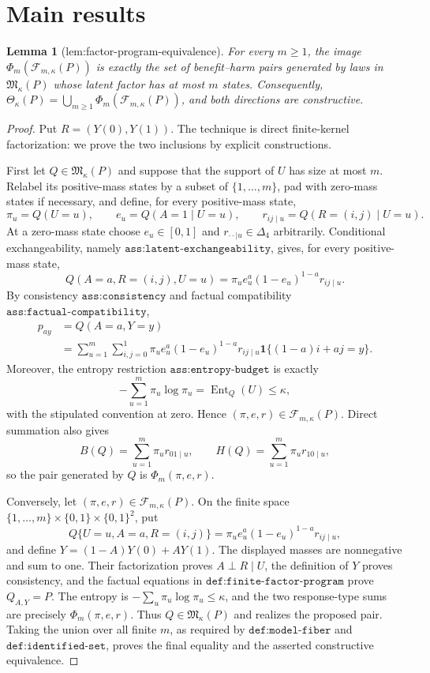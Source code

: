 \documentclass{article}
\newtheorem{lemma}{Lemma}
\begin{document}
\section{Main results}

\begin{lemma}[lem:factor-program-equivalence]\label{lem:factor-program-equivalence}
For every \(m\geq1\), the image \(\Phi_m(\mathcal F_{m,\kappa}(P))\) is exactly the set of benefit--harm pairs generated by laws in \(\mathfrak M_\kappa(P)\) whose latent factor has at most \(m\) states. Consequently, \(\Theta_\kappa(P)=\bigcup_{m\geq1}\Phi_m(\mathcal F_{m,\kappa}(P))\), and both directions are constructive.
\end{lemma}
\begin{proof}
Put \(R=(Y(0),Y(1))\).  The technique is direct finite-kernel factorization: we prove the two inclusions by explicit constructions.

First let \(Q\in\mathfrak M_\kappa(P)\) and suppose that the support of \(U\) has size at most \(m\).  Relabel its positive-mass states by a subset of \(\{1,\ldots,m\}\), pad with zero-mass states if necessary, and define, for every positive-mass state,
\[
 \pi_u=Q(U=u),\qquad e_u=Q(A=1\mid U=u),\qquad
 r_{ij\mid u}=Q(R=(i,j)\mid U=u).
\]
At a zero-mass state choose \(e_u\in[0,1]\) and \(r_{\cdot\cdot\mid u}\in\Delta_4\) arbitrarily.  Conditional exchangeability, namely \(\texttt{ass:latent-exchangeability}\), gives, for every positive-mass state,
\[
 Q(A=a,R=(i,j),U=u)
 =\pi_u e_u^a(1-e_u)^{1-a}r_{ij\mid u}.
\]
By consistency \(\texttt{ass:consistency}\) and factual compatibility \(\texttt{ass:factual-compatibility}\),
\[
 \begin{aligned}
 p_{ay}
 &=Q(A=a,Y=y)\\
 &=\sum_{u=1}^m\sum_{i,j=0}^1
 \pi_u e_u^a(1-e_u)^{1-a}r_{ij\mid u}
 \mathbf 1\{(1-a)i+aj=y\}.
 \end{aligned}
\]
Moreover, the entropy restriction \(\texttt{ass:entropy-budget}\) is exactly
\[
 -\sum_{u=1}^m\pi_u\log\pi_u=\operatorname{Ent}_Q(U)\leq\kappa,
\]
with the stipulated convention at zero.  Hence \((\pi,e,r)\in\mathcal F_{m,\kappa}(P)\).  Direct summation also gives
\[
 B(Q)=\sum_{u=1}^m\pi_u r_{01\mid u},\qquad
 H(Q)=\sum_{u=1}^m\pi_u r_{10\mid u},
\]
so the pair generated by \(Q\) is \(\Phi_m(\pi,e,r)\).

Conversely, let \((\pi,e,r)\in\mathcal F_{m,\kappa}(P)\).  On the finite space \(\{1,\ldots,m\}\times\{0,1\}\times\{0,1\}^2\), put
\[
 Q\{U=u,A=a,R=(i,j)\}
 =\pi_u e_u^a(1-e_u)^{1-a}r_{ij\mid u},
\]
and define \(Y=(1-A)Y(0)+AY(1)\).  The displayed masses are nonnegative and sum to one.  Their factorization proves \(A\perp R\mid U\), the definition of \(Y\) proves consistency, and the factual equations in \(\texttt{def:finite-factor-program}\) prove \(Q_{A,Y}=P\).  The entropy is \(-\sum_u\pi_u\log\pi_u\leq\kappa\), and the two response-type sums are precisely \(\Phi_m(\pi,e,r)\).  Thus \(Q\in\mathfrak M_\kappa(P)\) and realizes the proposed pair.  Taking the union over all finite \(m\), as required by \(\texttt{def:model-fiber}\) and \(\texttt{def:identified-set}\), proves the final equality and the asserted constructive equivalence.
\end{proof}
\end{document}

